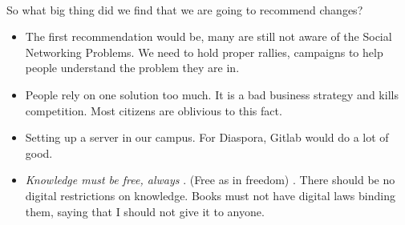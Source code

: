 \documentclass[11pt]{book}
\begin{document}
\\So what big thing did we find that we are going to recommend changes? 
\begin{itemize}
	\item The first recommendation would be, many are still not aware of the Social Networking Problems.
		We need to hold proper rallies, campaigns to help people understand the problem they are in.
	\item People rely on one solution too much. It is a bad business strategy and kills competition. Most 
		citizens are oblivious to this fact. 
	\item Setting up a server in our campus. For Diaspora, Gitlab would do a lot of good.
	\item \emph{Knowledge must be free, always} . (Free as in freedom) . There should be no digital restrictions on knowledge. 
		Books must not have digital laws binding them, saying that I should not give it to anyone. 

\end{itemize}
\newpage
\renewcommand{\cftchapdotsep}{\cftdotsep}
\end{document}
